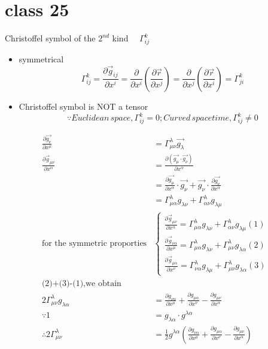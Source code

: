 \documentclass[12pt, a4paper, oneside, UTF8]{ctexbook}  %
\newcommand{\pa}{\partial}
\begin{document}
\section{class 25}
\begin{defn}
    Christoffel symbol of the $2^{nd}$ kind $\quad\Gamma^k_{ij}$
\begin{itemize}
    \item symmetrical
    \[\Gamma^k_{ij}=\frac{\pa \vec{g}_{ij}}{\pa x^i}=\frac{\pa}{\pa x^i}\left(\frac{\pa \vec{r}}{\pa x^j}\right)
    =\frac{\pa}{\pa x^j}\left(\frac{\pa \vec{r}}{\pa x^i}\right)=\Gamma^k_{ji}
    \]
    \item Christoffel symbol is NOT a tensor
    \[
        \because Euclidean\, space,\Gamma^k_{ij}=0;Curved\, spacetime,\Gamma^k_{ij}\neq0
    \]
\end{itemize}
\end{defn}
\begin{corollary}
\begin{align*}
    \frac{\pa\vec{g_\nu}}{\pa x^\mu}&=\Gamma^\lambda_{\mu\nu}\vec{g_\lambda}\\
    \frac{\pa\vec{g}_{\mu\nu}}{\pa x^\alpha}&=\frac{\pa\left(\vec{g_\mu}\cdot\vec{g_\nu}\right)}{\pa x^\alpha}\\
    &=\frac{\pa\vec{g_\mu}}{\pa x^\alpha}\cdot\vec{g_\nu}+
    \vec{g_\nu}\cdot\frac{\pa\vec{g_\nu}}{\pa x^\alpha}\\
    &=\Gamma^\lambda_{\mu\alpha}g_{\lambda\nu}+\Gamma^\lambda_{\alpha\nu}g_{\lambda\mu}\\
    \text{for the symmetric proporties}
    &\begin{cases}
        \frac{\pa\vec{g}_{\mu\nu}}{\pa x^\alpha}
        =\Gamma^\lambda_{\mu\alpha}g_{\lambda\nu}
        +\Gamma^\lambda_{\alpha\nu}g_{\lambda\mu}(1)\\
        \frac{\pa\vec{g}_{\nu\alpha}}{\pa x^\mu}
        =\Gamma^\lambda_{\mu\alpha}g_{\lambda\nu}
        +\Gamma^\lambda_{\mu\nu}g_{\lambda\alpha}(2)\\
        \frac{\pa\vec{g}_{\mu\alpha}}{\pa x^\nu}
        =\Gamma^\lambda_{\nu\alpha}g_{\lambda\mu}
        +\Gamma^\lambda_{\mu\nu}g_{\lambda\alpha}(3)
    \end{cases}\\
    \text{(2)+(3)-(1),we obtain}&\\
    2\Gamma^\lambda_{\mu\nu}g_{\lambda\alpha}&=
    \frac{\pa g_{\nu\alpha}}{\pa x^\mu}
    +\frac{\pa g_{\mu\alpha}}{\pa x^\nu}
    -\frac{\pa g_{\mu\nu}}{\pa x^\alpha}\\
    \because 1&=g_{\lambda\alpha}\cdot g^{\lambda\alpha}\\
    \therefore 2\Gamma^\lambda_{\mu\nu}&=\frac{1}{2}g^{\lambda\alpha}
    \left(\frac{\pa g_{\nu\alpha}}{\pa x^\mu}
    +\frac{\pa g_{\mu\alpha}}{\pa x^\nu}
    -\frac{\pa g_{\mu\nu}}{\pa x^\alpha}\right)
\end{align*}
\end{corollary}
\end{document}
